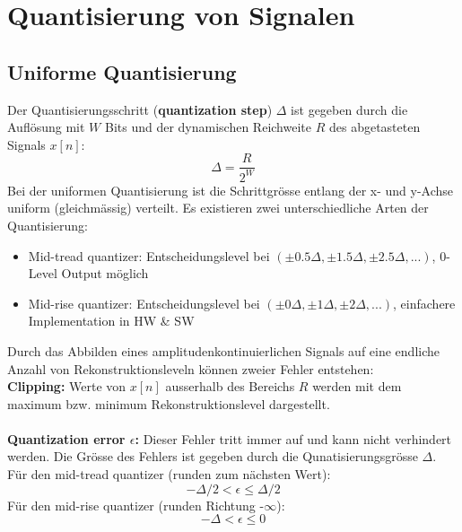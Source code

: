 \section{Quantisierung von Signalen}
\subsection{Uniforme Quantisierung}
Der Quantisierungsschritt (\textbf{quantization step}) $\Delta$ ist gegeben
durch die Auflösung mit $W$ Bits und der dynamischen Reichweite $R$ des
abgetasteten Signals $x[n]$:
\[ \Delta = \frac{R}{2^W} \]
Bei der uniformen Quantisierung ist die Schrittgrösse entlang der x- und y-Achse uniform (gleichmässig) verteilt. 
Es existieren zwei unterschiedliche Arten der Quantisierung: 
\begin{itemize}[noitemsep,topsep=3pt]
	\item Mid-tread quantizer: Entscheidungslevel bei $(\pm 0.5\Delta, \pm 1.5\Delta, \pm 2.5\Delta,...)$, 0-Level Output möglich
	\item Mid-rise quantizer: Entscheidungslevel bei $(\pm 0\Delta, \pm 1\Delta, \pm 2\Delta,...)$, einfachere Implementation in HW \& SW
\end{itemize}\vspace{11pt}
Durch das Abbilden eines amplitudenkontinuierlichen Signals auf eine endliche
Anzahl von Rekonstruktionsleveln können zweier Fehler entstehen:\\
\textbf{Clipping:} Werte von $x[n]$ ausserhalb des Bereichs $R$ werden mit
dem maximum bzw. minimum Rekonstruktionslevel dargestellt.\\\\
\textbf{Quantization error $\epsilon$:} Dieser Fehler tritt immer auf und
kann nicht verhindert werden. Die Grösse des Fehlers ist gegeben durch die
Qunatisierungsgrösse $\Delta$.\\
Für den mid-tread quantizer (runden zum nächsten Wert):
\[ -\Delta/2 < \epsilon \leq \Delta / 2 \]
Für den mid-rise quantizer (runden Richtung -$\infty$):
\[ -\Delta < \epsilon \leq 0 \]
\newpage 

